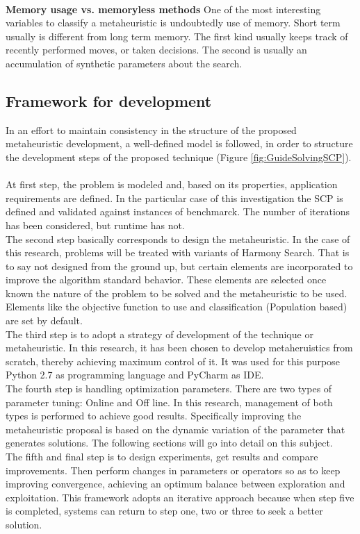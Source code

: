 ~\\
\textbf{Memory usage vs. memoryless methods}
One of the most interesting variables to classify a metaheuristic is undoubtedly use of memory. Short term usually is different from long term memory. The first kind usually keeps track of recently performed moves, or taken decisions. The second is usually an accumulation of synthetic parameters about the search. 

\subsection{Framework for development}
In an effort to maintain consistency in the structure of the proposed metaheuristic development, a well-defined model is followed, in order to structure the development steps of the proposed technique (Figure \ref{fig:GuideSolvingSCP}). \\
~\\
At first step, the problem is modeled and, based on its properties, application requirements are defined. In the particular case of this investigation the SCP is defined and validated against instances of benchmarck. The number of iterations has been considered, but runtime has not.\\

The second step basically corresponds to design the metaheuristic. In the case of this research, problems will be treated with variants of Harmony Search. That is to say not designed from the ground up, but certain elements are incorporated to improve the algorithm standard behavior. These elements are selected once known the nature of the problem to be solved and the metaheuristic to be used. Elements like the objective function to use and classification (Population based) are set by default.\\

The third step is to adopt a strategy of development of the technique or metaheuristic. In this research, it has been chosen to develop metaheruistics from scratch, thereby achieving maximum control of it. It was used for this purpose Python 2.7 as programming language and  PyCharm as IDE.\\

The fourth step is handling optimization parameters. There are two types of parameter tuning: Online and Off line. In this research, management of both types is performed to achieve good results. Specifically improving the metaheuristic proposal is based on the dynamic variation of the parameter that generates solutions. The following sections will go into detail on this subject.\\

The fifth and final step is to design experiments, get results and compare improvements. Then perform changes in parameters or operators so as to keep improving convergence, achieving an optimum balance between exploration and exploitation. This framework adopts an iterative approach because when step five is completed, systems can return to step one, two or three to seek a better solution.